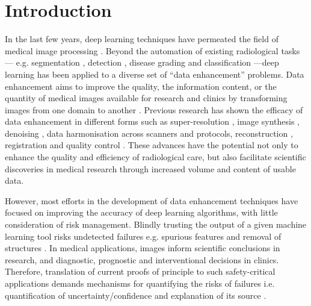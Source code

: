 \section{Introduction}

In the last few years, deep learning techniques have permeated the field of medical image processing \cite{shen2017deep,litjens2017survey}. Beyond the automation of existing radiological tasks--- e.g. segmentation \cite{kamnitsas2017efficient}, detection \cite{roth2014new}, disease grading and classification \cite{araujo2017classification}---deep learning has been applied to a diverse set of ``data enhancement'' problems. Data enhancement aims to improve the quality, the information content, or the quantity of medical images available for research and clinics by transforming images from one domain to another \cite{isola2017image}. Previous research has shown the efficacy of data enhancement in different forms such as super-resolution \cite{oktay2016multi,chen2018efficient,ravi2019adversarial}, image synthesis \cite{nie2016estimating,kang2017deep}, denoising \cite{benou2017ensemble,chen2017low}, data harmonisation \cite{karayumak2018harmonizing,tax2019cross} across scanners and protocols, reconstruction \cite{sun2016deep,jin2017deep,hammernik2018learning,schlemper2018deep,zhu2018image,yang2018dagan,yoon2019efficient}, registration \cite{sokooti2017nonrigid,balakrishnan2018unsupervised} and quality control \cite{wu2017fuiqa,esses2018automated}.  These advances have the potential not only to enhance the quality and efficiency of radiological care, but also facilitate scientific discoveries in medical research through increased volume and content of usable data. 

However,  most efforts in the development of data enhancement techniques have focused on improving the accuracy of deep learning algorithms, with little consideration of risk management. Blindly trusting the output of a given machine learning tool risks undetected failures e.g. spurious features and removal of structures \cite{cohen2018distribution}. In medical applications, images inform scientific conclusions in research, and diagnostic, prognostic and interventional decisions in clinics. Therefore, translation of current proofs of principle to such safety-critical applications demands mechanisms for quantifying the risks of failures i.e. quantification of uncertainty/confidence and explanation of its source \cite{begoli2019need}. 

